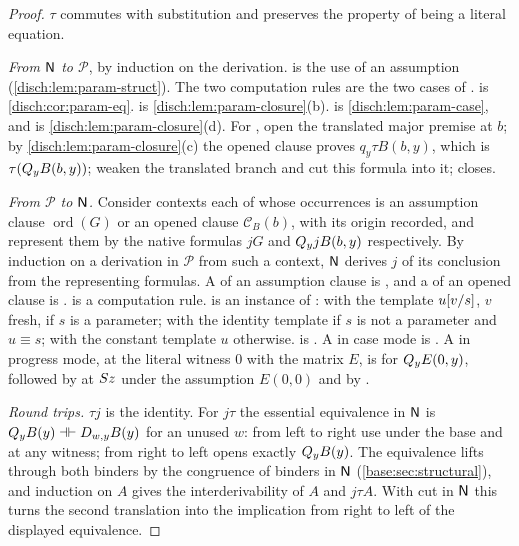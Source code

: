 \begin{proof}
$\tau$ commutes with substitution and preserves the property of being a
literal equation.

\emph{From $\mathsf{N}$ to $\mathcal P$}, by induction on the derivation.
 is the use of an assumption
(\cref{disch:lem:param-struct}). The two computation rules are the two
cases of .  is
\cref{disch:cor:param-eq}.  is
\cref{disch:lem:param-closure}(b).  is
\cref{disch:lem:param-case}, and  is
\cref{disch:lem:param-closure}(d). For , open the translated
major premise at $b$; by \cref{disch:lem:param-closure}(c) the opened
clause proves $q_y\tau B(b,y)$, which is $\tau(Q_{y}B(b,y))$; weaken the
translated branch and cut this formula into it;  closes.

\emph{From $\mathcal P$ to $\mathsf{N}$.} Consider contexts each of whose
occurrences is an assumption clause $\operatorname{ord}(G)$ or an opened
clause $\mathcal C_B(b)$, with its origin recorded, and represent them by
the native formulas $jG$ and $Q_{y}jB(b,y)$ respectively. By induction on
a derivation in $\mathcal P$ from such a context, $\mathsf{N}$ derives $j$ of its
conclusion from the representing formulas. A  of an
assumption clause is , and a  of an opened
clause is .  is a computation rule.
 is an instance of : with the template
$u[v/s]$, $v$ fresh, if $s$ is a parameter; with the identity
template if $s$ is not a parameter and $u\equiv s$; with the constant
template $u$ otherwise.  is . A
 in case mode is . A  in
progress mode, at the literal witness $0$ with the matrix $E$, is
 for $Q_{y}E(0,y)$, followed by  at $S z$
under the assumption $E(0,0)$ and by .

\emph{Round trips.} $\tau j$ is the identity. For $j\tau$ the essential
equivalence in $\mathsf{N}$ is $Q_{y}B(y)\dashv\vdash D_{w,y}B(y)$ for an unused
$w$: from left to right use  under the base and 
at any witness; from right to left  opens exactly
$Q_{y}B(y)$. The equivalence lifts through both binders by the congruence
of binders in $\mathsf{N}$ (\cref{base:sec:structural}), and induction on $A$
gives the interderivability of $A$ and $j\tau A$. With cut in $\mathsf{N}$ this
turns the second translation into the implication from right to left of
the displayed equivalence.
\end{proof}

